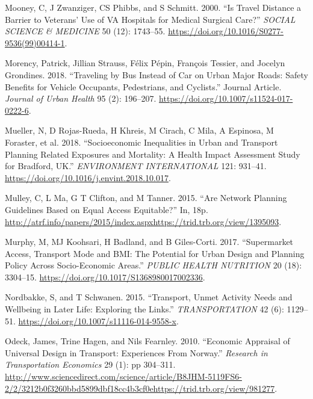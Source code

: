 \documentclass[12pt, oneside]{report}
\newlength{\cslhangindent}
\newlength{\cslentryspacingunit} %
\newenvironment{CSLReferences}[2] %
 {%
  \setlength{\parindent}{0pt}
  \ifodd #1
  \let\oldpar\par
  \def\par{\hangindent=\cslhangindent\oldpar}
  \fi
  \setlength{\parskip}{#2\cslentryspacingunit}
 }%
 {}
\begin{document}
\begin{CSLReferences}{1}{0}
\leavevmode{}%
Mooney, C, J Zwanziger, CS Phibbs, and S Schmitt. 2000. {``Is Travel
Distance a Barrier to Veterans' Use of {VA} Hospitals for Medical
Surgical Care?''} \emph{SOCIAL SCIENCE \& MEDICINE} 50 (12): 1743--55.
\url{https://doi.org/10.1016/S0277-9536(99)00414-1}.

\leavevmode{}%
Morency, Patrick, Jillian Strauss, Félix Pépin, François Tessier, and
Jocelyn Grondines. 2018. {``Traveling by Bus Instead of Car on Urban
Major Roads: Safety Benefits for Vehicle Occupants, Pedestrians, and
Cyclists.''} Journal Article. \emph{Journal of Urban Health} 95 (2):
196--207. \url{https://doi.org/10.1007/s11524-017-0222-6}.

\leavevmode{}%
Mueller, N, D Rojas-Rueda, H Khreis, M Cirach, C Mila, A Espinosa, M
Foraster, et al. 2018. {``Socioeconomic Inequalities in Urban and
Transport Planning Related Exposures and Mortality: {A} Health Impact
Assessment Study for {Bradford}, {UK}.''} \emph{ENVIRONMENT
INTERNATIONAL} 121: 931--41.
\url{https://doi.org/10.1016/j.envint.2018.10.017}.

\leavevmode{}%
Mulley, C, L Ma, G T Clifton, and M Tanner. 2015. {``Are Network
Planning Guidelines Based on Equal Access Equitable?''} In, 18p.
\url{http://atrf.info/papers/2015/index.aspxhttps://trid.trb.org/view/1395093}.

\leavevmode{}%
Murphy, M, MJ Koohsari, H Badland, and B Giles-Corti. 2017.
{``Supermarket Access, Transport Mode and {BMI}: The Potential for Urban
Design and Planning Policy Across Socio-Economic Areas.''} \emph{PUBLIC
HEALTH NUTRITION} 20 (18): 3304--15.
\url{https://doi.org/10.1017/S1368980017002336}.

\leavevmode{}%
Nordbakke, S, and T Schwanen. 2015. {``Transport, Unmet Activity Needs
and Wellbeing in Later Life: Exploring the Links.''}
\emph{TRANSPORTATION} 42 (6): 1129--51.
\url{https://doi.org/10.1007/s11116-014-9558-x}.

\leavevmode{}%
Odeck, James, Trine Hagen, and Nils Fearnley. 2010. {``Economic
{Appraisal} of {Universal Design} in {Transport}: {Experiences From
Norway}.''} \emph{Research in Transportation Economics} 29 (1): pp
304--311.
\url{http://www.sciencedirect.com/science/article/B8JHM-5119FS6-2/2/3212b0f3260bbd5899dbf18cc4b3cf0ehttps://trid.trb.org/view/981277}.


\end{CSLReferences}
\end{document}
